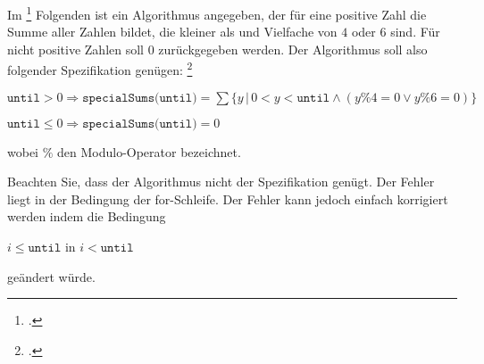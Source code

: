 \documentclass{bschlangaul-aufgabe}
\begin{document}

\let\c=\liKontrollCode
\let\b=\liBedingung

Im
\footcite{examen:66116:2014:09} Folgenden ist ein Algorithmus angegeben,
der für eine positive Zahl  die Summe aller Zahlen
bildet, die kleiner als  und Vielfache von $4$ oder
$6$ sind. Für nicht positive Zahlen soll $0$ zurückgegeben werden. Der
Algorithmus soll also folgender Spezifikation genügen:
\footcite[Kontrollflussorientiertes Testen, Aufgabe 2]{sosy:ab:7}

\bigskip

{\footnotesize
\noindent
$\texttt{until} > 0 \Rightarrow \texttt{specialSums(until)} =
\sum \{y \, | \, 0 < y < \texttt{until} \land (y\%4 = 0 \lor y\%6 = 0)\}$

\noindent
$\texttt{until} \leq 0 \Rightarrow \texttt{specialSums(until)} = 0$
}

\bigskip\noindent
wobei $\%$ den Modulo-Operator bezeichnet.


\noindent
Beachten Sie, dass der Algorithmus nicht der Spezifikation genügt. Der
Fehler liegt in der Bedingung der for-Schleife. Der Fehler kann jedoch
einfach korrigiert werden indem die Bedingung

\begin{center}
$i \leq \texttt{until}$ in $i < \texttt{until}$
\end{center}

geändert würde.
\end{document}

